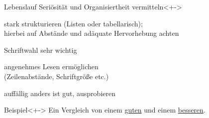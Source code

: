 \begin{frame}{Lebenslauf}
  \alert{Seriösität und Organisiertheit vermitteln}<+->
  \begin{description}[Organisiertheit]
  \item[Organisiertheit] stark strukturieren (Listen oder
    tabellarisch); \\
    hierbei auf Abstände und adäquate Hervorhebung achten
  \item[Seriösität] Schriftwahl sehr wichtig
  \item[Lesbarkeit] angenehmes Lesen ermöglichen \\
    (Zeilenabstände, Schriftgröße etc.)
  \item[Aufmerksamkeit] auffällig anders ist gut, ausprobieren
  \end{description}
  \begin{exampleblock}{Beispiel}<+->
    Ein Vergleich von einem \href{./examples/cv.pdf}{guten}
    und einem \href{./examples/cv_besser.pdf}{besseren}.%
  \end{exampleblock}
\end{frame}

